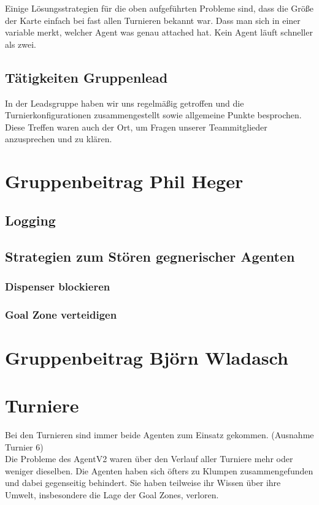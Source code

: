 \documentclass[runningheads]{llncs}
\begin{document}
Einige Lösungsstrategien für die oben aufgeführten Probleme sind, dass die Größe der Karte einfach bei fast allen Turnieren bekannt war. Dass man sich in einer variable merkt, welcher Agent was genau attached hat. Kein Agent läuft schneller als zwei.

\subsection{Tätigkeiten Gruppenlead}
In der Leadsgruppe haben wir uns regelmäßig getroffen und die Turnierkonfigurationen zusammengestellt sowie allgemeine Punkte besprochen. Diese Treffen waren auch der Ort, um Fragen unserer Teammitglieder anzusprechen und zu klären. 
\section{Gruppenbeitrag Phil Heger}
\subsection{Logging}
\subsection{Strategien zum Stören gegnerischer Agenten}
\subsubsection{Dispenser blockieren}
\subsubsection{Goal Zone verteidigen}

\section{Gruppenbeitrag Björn Wladasch}

\section{Turniere}
Bei den Turnieren sind immer beide Agenten zum Einsatz gekommen. (Ausnahme Turnier 6)\\
Die Probleme des AgentV2 waren über den Verlauf aller Turniere mehr oder weniger dieselben.  Die Agenten haben sich öfters zu Klumpen zusammengefunden und dabei gegenseitig behindert. Sie haben teilweise ihr Wissen über ihre Umwelt, insbesondere die Lage der Goal Zones, verloren. 
\end{document}
